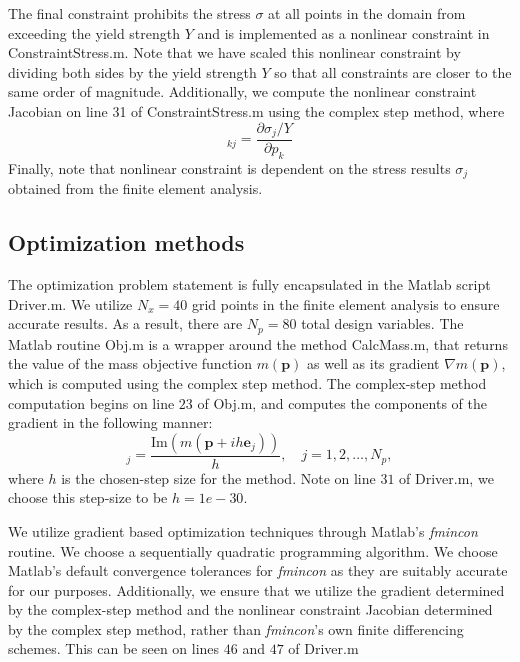 \documentclass[11pt]{article}
\newcommand{\bs}[1] {\boldsymbol{#1}}
\begin{document}
The final constraint prohibits the
stress $\sigma$ at all points in the domain from exceeding
the yield strength $Y$ and is implemented as a nonlinear
constraint in ConstraintStress.m. Note that we have scaled
this nonlinear constraint by dividing both sides by the
yield strength $Y$ so that all constraints are closer
to the same order of magnitude.
Additionally, we compute the nonlinear
constraint Jacobian on line 31 of ConstraintStress.m
using the complex step method, where
\begin{equation}
[ \nabla c ]_{kj} = \frac{\partial \sigma_j / Y}{\partial p_k}
\end{equation}
Finally, note that
nonlinear constraint is dependent on the stress results
$\sigma_j$ obtained from the finite element analysis.

\subsection{Optimization methods}

The optimization problem statement is fully encapsulated
in the Matlab script Driver.m. We utilize $N_x=40$ grid
points in the finite element analysis to ensure accurate
results. As a result, there are $N_p=80$ total design
variables. The Matlab routine Obj.m is a wrapper around
the method CalcMass.m, that returns the value of the
mass objective function $m(\bs{p})$ as well as its
gradient $\nabla m(\bs{p})$, which is computed using
the complex step method. The complex-step method
computation begins on line $23$ of Obj.m, and computes the
components of the gradient in the following manner:
\begin{equation}
[ \nabla m(\bs{p}) ]_j = \frac{\text{Im}(m( \bs{p} + i h \bs{e}_j))}{h},
\quad j=1,2,\dots,N_p,
\end{equation}
where $h$ is the chosen-step size for the method. Note
on line $31$ of Driver.m, we choose this step-size
to be $h=1e-30$. 

We utilize gradient based optimization techniques through
Matlab's \emph{fmincon} routine. We choose a
sequentially quadratic programming algorithm.
We choose Matlab's default convergence tolerances
for \emph{fmincon} as they are suitably accurate
for our purposes.
Additionally, we ensure that we utilize the gradient
determined by the complex-step method and the
nonlinear constraint Jacobian determined by the
complex step method, rather than
\emph{fmincon}'s own finite differencing schemes.
This can be seen on lines $46$ and $47$ of Driver.m 
\end{document}
